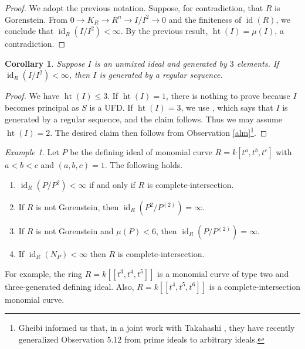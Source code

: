 \documentclass[10. pt,a4paper]{amsart}
\newtheorem{corollary}[theorem]{Corollary}
\theoremstyle{definition}
\theoremstyle{remark}
\newtheorem{example}[theorem]{Example}
\newcommand{\id}{\operatorname{id}}
\begin{document}
\begin{proof}
	We adopt the previous notation. Suppose, for contradiction, that $R$ is Gorenstein. From $0 \to K_R \to R^n \to I/I^2 \to 0$ and the finiteness of $\id(R)$, we conclude that $\id_R(I/I^2) < \infty$. By the previous result, $\operatorname{ht}(I) = \mu(I)$, a contradiction.
\end{proof}

\begin{corollary}\label{513}
	Suppose $I$ is an unmixed ideal and generated by $3$ elements. If $\id_R(I/I^2) < \infty$, then $I$ is generated by a regular sequence.
\end{corollary}

\begin{proof}
	We have $\operatorname{ht}(I) \leq 3$. If $\operatorname{ht}(I) = 1$, there is nothing to prove because $I$ becomes principal as $S$ is a UFD. If $\operatorname{ht}(I) = 3$, we use \cite[1.2.21]{BH}, which says that $I$ is generated by a regular sequence, and the claim follows. Thus we may assume $\operatorname{ht}(I) = 2$. The desired claim then follows from Observation \ref{alm}\footnote{Gheibi informed us that, in a joint work with Takahashi \cite{G}, they have recently generalized Observation 5.12 from prime ideals to arbitrary ideals.}.
\end{proof}
 

\begin{example}
	Let $P$ be the defining ideal of monomial curve 
	$R=k[t^{a},t^b,t^c]$ with $a<b<c$ and $(a,b,c)=1$. The
	following holds.
	\begin{enumerate}
	\item[(i)]  $\id_R(P/P^2)< \infty$ if and only if $R$ is  complete-intersection.
	\item[(ii)] If $R$ is not Gorenstein, then $\id_R(P^2/P^{(2)})= \infty$.
	\item[(iii)] If $R$ is not Gorenstein and $\mu(P)<6$, then $\id_R(P/P^{(2)})= \infty$.
	\item[(iv)]  If  $\id_R(N_P)< \infty$ then $R$ is  complete-intersection.
	
\end{enumerate}	
\end{example}

 For example, the ring $R=k[[t^3,t^4,t^5]]$ is a  monomial curve   of type two and three-generated defining ideal. Also, $R=k[[t^4,t^5,t^6]]$ is a complete-intersection  monomial curve.
 
\end{document}
